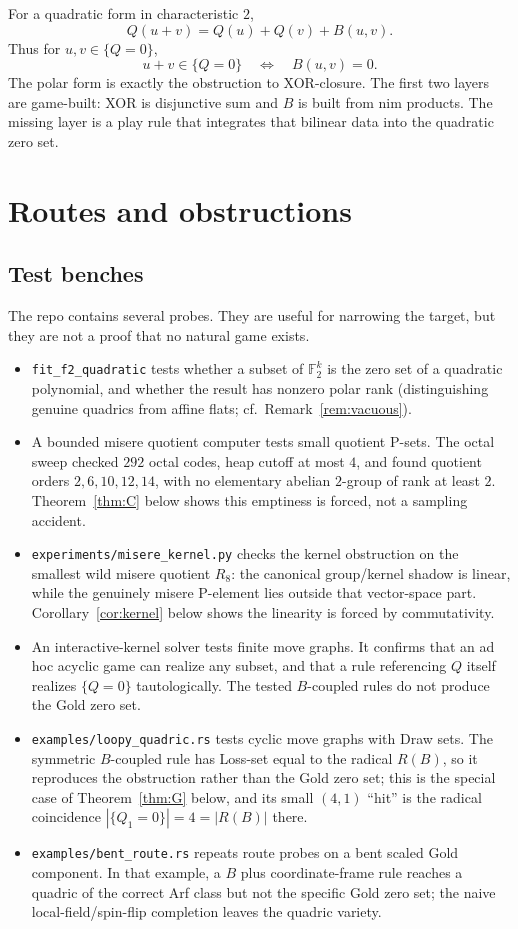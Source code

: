 \documentclass[11pt]{article}
\theoremstyle{plain}
\theoremstyle{definition}
\newcommand{\F}{\mathbb{F}}
\begin{document}
For a quadratic form in characteristic $2$,
\[
  Q(u+v)=Q(u)+Q(v)+B(u,v).
\]
Thus for $u,v\in\{Q=0\}$,
\[
  u+v\in\{Q=0\}\quad\Longleftrightarrow\quad B(u,v)=0.
\]
The polar form is exactly the obstruction to XOR-closure. The first two layers
are game-built: XOR is disjunctive sum and $B$ is built from nim products. The
missing layer is a play rule that integrates that bilinear data into the
quadratic zero set.

\section{Routes and obstructions}\label{sec:blocks}

\subsection{Test benches}\label{sec:benches}

The repo contains several probes. They are useful for narrowing the target, but
they are not a proof that no natural game exists.

\begin{itemize}[leftmargin=*]
\item \texttt{fit\_f2\_quadratic} tests whether a subset of $\F_2^k$ is the zero
set of a quadratic polynomial, and whether the result has nonzero polar rank
(distinguishing genuine quadrics from affine flats; cf.\
Remark~\ref{rem:vacuous}).
\item A bounded misere quotient computer tests small quotient P-sets. The octal
sweep checked $292$ octal codes, heap cutoff at most $4$, and found quotient
orders $2,6,10,12,14$, with no elementary abelian $2$-group of rank at least
$2$. Theorem~\ref{thm:C} below shows this emptiness is forced, not a sampling
accident.
\item \texttt{experiments/misere\_kernel.py} checks the kernel obstruction on
the smallest wild misere quotient $R_8$: the canonical group/kernel shadow is
linear, while the genuinely misere P-element lies outside that vector-space
part. Corollary~\ref{cor:kernel} below shows the linearity is forced by
commutativity.
\item An interactive-kernel solver tests finite move graphs. It confirms that
an ad hoc acyclic game can realize any subset, and that a rule referencing $Q$
itself realizes $\{Q=0\}$ tautologically. The tested $B$-coupled rules do not
produce the Gold zero set.
\item \texttt{examples/loopy\_quadric.rs} tests cyclic move graphs with Draw
sets. The symmetric $B$-coupled rule has Loss-set equal to the radical $R(B)$,
so it reproduces the obstruction rather than the Gold zero set; this is the
special case of Theorem~\ref{thm:G} below, and its small $(4,1)$ ``hit'' is
the radical coincidence $|\{Q_1=0\}|=4=|R(B)|$ there.
\item \texttt{examples/bent\_route.rs} repeats route probes on a bent scaled
Gold component. In that example, a $B$ plus coordinate-frame rule reaches a
quadric of the correct Arf class but not the specific Gold zero set; the naive
local-field/spin-flip completion leaves the quadric variety.
\end{itemize}
\end{document}
